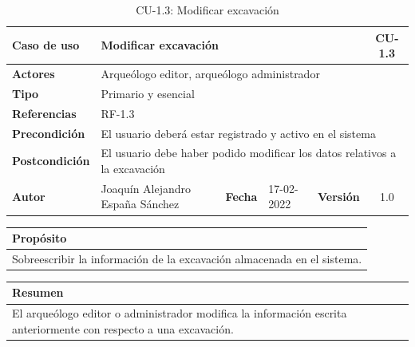     \begin{table}[H]
    \begin{center}
        \begin{adjustbox}{width=\textwidth}
        \begin{tabular}{ | l | l | l | l | c | c | } 
            \hline
            \textbf{Caso de uso} & \multicolumn{4}{l|}{Modificar excavación} & \cellcolor{gray!50} \textbf{CU-1.3}\\
            \hline
            \textbf{Actores} & \multicolumn{5}{p{0.9\linewidth}|}{Arqueólogo editor, arqueólogo administrador} \\
            \hline
            \textbf{Tipo} & \multicolumn{5}{l|}{Primario y esencial} \\
            \hline
            \textbf{Referencias} & \multicolumn{3}{l|}{RF-1.3} & \multicolumn{2}{l|}{ }\\
            \hline
            \textbf{Precondición} & \multicolumn{5}{l|}{El usuario deberá estar registrado y activo en el sistema} \\
            \hline
            \textbf{Postcondición} & \multicolumn{5}{l|}{El usuario debe haber podido modificar los datos relativos a la
            excavación} \\
            \hline
            \textbf{Autor} & \multicolumn{1}{p{0.25\linewidth}|}{Joaquín Alejandro España Sánchez} & \textbf{Fecha} & 
            17-02-2022     & \textbf{Versión}                                                      & 1.0\\
            \hline
        \end{tabular}
        \end{adjustbox}
        \caption{CU-1.3: Modificar excavación}
        \label{tab:modify-excavation}
    \end{center}
    \end{table}

    \begin{table}[H]
        \centering
        \begin{tabularx}{\textwidth}{@{} |L |@{}} \hline
            \textbf{Propósito} \\
            \hline
            Sobreescribir la información de la excavación almacenada en el sistema. \\
            \hline
        \end{tabularx}
    \end{table}

    \begin{table}[H]
        \centering
        \begin{tabularx}{\textwidth}{@{} |L |@{}} \hline
            \textbf{Resumen} \\
            \hline
            El arqueólogo editor o administrador modifica la información escrita
            anteriormente con respecto a una excavación.\\
            \hline
        \end{tabularx}
    \end{table}

